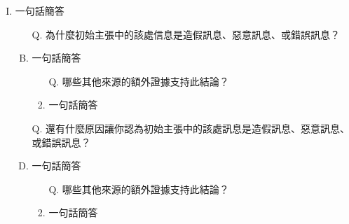 \documentclass[a4paper, 12pt]{article}
\begin{document}
\begin{enumerate}[I.]
        \item {\color{gray}一句話簡答} %
            \begin{enumerate}[A.]
                \item [Q.]為什麼{\color{blue}初始主張}中的該處信息是造假訊息、惡意訊息、或錯誤訊息？
                \item {\color{gray}一句話簡答} %
                    \begin{enumerate}[1.]
                        \item [Q.]哪些其他來源的額外證據支持此結論？
                        \item {\color{gray}一句話簡答} %
                    \end{enumerate}
                \item [Q.]還有什麼原因讓你認為{\color{blue}初始主張}中的該處訊息是造假訊息、惡意訊息、或錯誤訊息？
                \item {\color{gray}一句話簡答} %
                    \begin{enumerate}[1.]
                        \item [Q.]哪些其他來源的額外證據支持此結論？
                        \item {\color{gray}一句話簡答} %
                    \end{enumerate}
            \end{enumerate}
    \end{enumerate}

\end{document}
